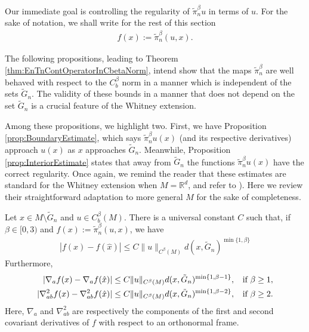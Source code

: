 \documentclass[11pt,reqno]{amsart}
\numberwithin{equation}{section}
\theoremstyle{plain}
\def\grad{\nabla}
\begin{document}
Our immediate goal is controlling the regularity of $\tilde \pi_n^\beta u$ in terms of $u$. For the sake of notation, we shall write for the rest of this section
\begin{align}\label{eqWhitney:FisPinU}
  f(x) := \tilde \pi_n^\beta(u,x).
\end{align}

The following propositions, leading to Theorem \ref{thm:EnTnContOperatorInCbetaNorm}, intend show that the maps $\tilde \pi_n^\beta$ are well behaved with respect to the $C^\beta_b$ norm in a manner which is independent of the sets $\tilde G_n$.  The validity of these bounds in a manner that does not depend on the set $\tilde G_n$ is a crucial feature of the Whitney extension.  

Among these propositions, we highlight two. First, we have Proposition \ref{prop:BoundaryEstimate}, which says $\tilde \pi_n^\beta u(x)$ (and its respective derivatives) approach $u(x)$ as $x$ approaches $\tilde G_n$. Meanwhile, Proposition \ref{prop:InteriorEstimate} states that away from $\tilde G_n$ the functions $\tilde \pi_n^\beta u(x)$ have the correct regularity. Once again, we remind the reader that these estimates are standard for the Whitney extension when $M=\mathbb{R}^d$, and refer to \cite[Chap. 6, Section 2]{Stei-71}). Here we review their straightforward adaptation to more general $M$ for the sake of completeness.

\begin{prop}\label{prop:BoundaryEstimate}
  Let $x\in M\setminus \tilde G_n$ and $u\in C^\beta_b(M)$. There is a universal constant $C$ such that, if $\beta \in [0,3)$ and $f(x) := \tilde \pi_n^\beta(u,x)$, we have 
  \begin{align*}
    |f(x)-f(\hat x)| \leq C\|u\|_{C^\beta(M)}d(x,\tilde G_n)^{\min\{1,\beta\}}
  \end{align*}	    
  Furthermore,
  \begin{align*}
    |\nabla_a f(x)-\nabla_a f(\hat x)| \leq C\|u\|_{C^\beta(M)}d(x,\tilde G_n)^{\min\{1,\beta-1\}},\;\;\textnormal{ if } \beta \geq 1,\\
    |\nabla_{ab}^2 f(x)-\nabla_{ab}^2 f(\hat x)| \leq C\|u\|_{C^\beta(M)}d(x,\tilde G_n)^{\min\{1,\beta-2\}},\;\;\textnormal{ if } \beta \geq 2.	
  \end{align*}	
  Here, $\grad_a$ and $\grad^2_{ab}$ are respectively the components of the first and second covariant derivatives of $f$ with respect to an orthonormal frame.
\end{prop}
\end{document}
